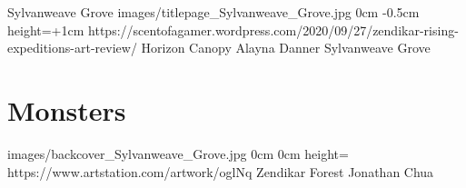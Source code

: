 \documentclass[letterpaper,openany,twoside,twocolumn]{book}
\begin{document}
	\regionTitlePage
		{Sylvanweave Grove}
		{images/titlepage_Sylvanweave_Grove.jpg}
		{0cm}
		{-0.5cm}
		{height=\paperheight+1cm}
		{https://scentofagamer.wordpress.com/2020/09/27/zendikar-rising-expeditions-art-review/}
		{Horizon Canopy}
		{Alayna Danner}
		{Sylvanweave Grove}
	
	\tableofcontents
	
	\mainmatter
	
	\MonsterSheetGeometry
	\part{Monsters}
	
	
	\regionLastPage
		{images/backcover_Sylvanweave_Grove.jpg}
		{0cm}
		{0cm}
		{height=\paperheight}
		{https://www.artstation.com/artwork/oglNq}
		{Zendikar Forest}
		{Jonathan Chua}
		{}
\end{document}
